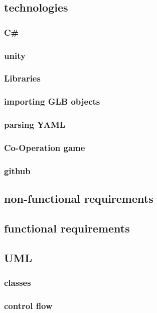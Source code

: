 \subsection{technologies}
\subsubsection{C\#}
\subsubsection{unity}

\subsubsection{Libraries}
\subsubsection*{importing GLB objects}
\subsubsection*{parsing YAML}
\subsubsection{Co-Operation game}
\subsubsection{github}

\subsection{non-functional requirements}

\subsection{functional requirements}

\subsection{UML}
\subsubsection{classes}
\subsubsection{control flow}

